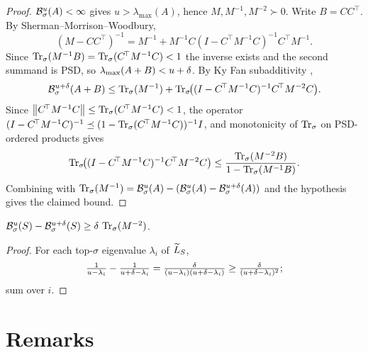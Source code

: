 \documentclass[11pt]{article}
\begin{document}
\begin{proof}
$\mathcal{B}^{u}_{\sigma}(A)<\infty$ gives $u>\lambda_{\max}(A)$, hence
$M,M^{-1},M^{-2}\succ 0$. Write $B=CC^{\!\top}$. By Sherman--Morrison--Woodbury,
\[
  (M-CC^{\!\top})^{-1}
   = M^{-1} + M^{-1}C(I-C^{\!\top}M^{-1}C)^{-1}C^{\!\top}M^{-1}.
\]
Since $\operatorname{Tr}_{\sigma}(M^{-1}B)=\operatorname{Tr}_{\sigma}(C^{\!\top}M^{-1}C)<1$ the inverse exists and the
second summand is PSD, so $\lambda_{\max}(A+B)<u+\delta$. By Ky Fan
subadditivity \cite[Thm.~4.3.47a]{HJ12},
\[
  \mathcal{B}^{u+\delta}_{\sigma}(A+B)
   \le \operatorname{Tr}_{\sigma}(M^{-1})
       + \operatorname{Tr}_{\sigma}\!\bigl((I-C^{\!\top}M^{-1}C)^{-1}C^{\!\top}M^{-2}C\bigr).
\]
Since $\left\lVert C^{\!\top}M^{-1}C \right\rVert\le\operatorname{Tr}_{\sigma}(C^{\!\top}M^{-1}C)<1$, the operator
$(I-C^{\!\top}M^{-1}C)^{-1}\preceq(1-\operatorname{Tr}_{\sigma}(C^{\!\top}M^{-1}C))^{-1}I$, and
monotonicity of $\operatorname{Tr}_{\sigma}$ on PSD-ordered products gives
\[
  \operatorname{Tr}_{\sigma}\!\bigl((I-C^{\!\top}M^{-1}C)^{-1}C^{\!\top}M^{-2}C\bigr)
   \le \frac{\operatorname{Tr}_{\sigma}(M^{-2}B)}{1-\operatorname{Tr}_{\sigma}(M^{-1}B)}.
\]
Combining with
$\operatorname{Tr}_{\sigma}(M^{-1})=\mathcal{B}^{u}_{\sigma}(A)-(\mathcal{B}^{u}_{\sigma}(A)-\mathcal{B}^{u+\delta}_{\sigma}(A))$
and the hypothesis gives the claimed bound.
\end{proof}

\begin{qsixclaim}\label{cl:phi-diff}
$\mathcal{B}^{u}_{\sigma}(S)-\mathcal{B}^{u+\delta}_{\sigma}(S)\ge\delta\,\operatorname{Tr}_{\sigma}(M^{-2})$.
\end{qsixclaim}
\begin{proof}
For each top-$\sigma$ eigenvalue $\lambda_i$ of $\widetilde{L}_S$,
\[
  \tfrac{1}{u-\lambda_i}-\tfrac{1}{u+\delta-\lambda_i}
   = \tfrac{\delta}{(u-\lambda_i)(u+\delta-\lambda_i)}
   \ge \tfrac{\delta}{(u+\delta-\lambda_i)^2};
\]
sum over $i$.
\end{proof}

\section*{Remarks}
\end{document}
